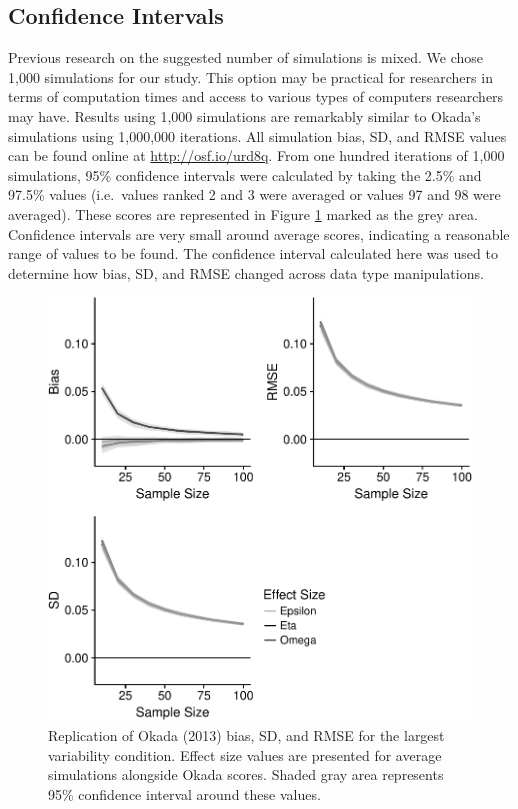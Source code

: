 \documentclass[english,man]{apa6}
\theoremstyle{definition}
\theoremstyle{definition}
\theoremstyle{definition}
\theoremstyle{remark}
\begin{document}
\subsection{Confidence Intervals}\label{confidence-intervals}

Previous research on the suggested number of simulations is mixed. We
chose 1,000 simulations for our study. This option may be practical for
researchers in terms of computation times and access to various types of
computers researchers may have. Results using 1,000 simulations are
remarkably similar to Okada's simulations using 1,000,000 iterations.
All simulation bias, SD, and RMSE values can be found online at
\url{http://osf.io/urd8q}. From one hundred iterations of 1,000
simulations, 95\% confidence intervals were calculated by taking the
2.5\% and 97.5\% values (i.e.~values ranked 2 and 3 were averaged or
values 97 and 98 were averaged). These scores are represented in Figure
\ref{fig:simulation-graph} marked as the grey area. Confidence intervals
are very small around average scores, indicating a reasonable range of
values to be found. The confidence interval calculated here was used to
determine how bias, SD, and RMSE changed across data type manipulations.

\begin{figure}[htbp]
\centering
\includegraphics{buchanan_scofield_files/figure-latex/simulation-graph-1.pdf}
\caption{\label{fig:simulation-graph}Replication of Okada (2013) bias, SD,
and RMSE for the largest variability condition. Effect size values are
presented for average simulations alongside Okada scores. Shaded gray
area represents 95\% confidence interval around these values.}
\end{figure}
\end{document}
